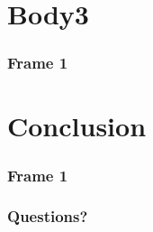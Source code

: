 \documentclass{beamer}
\begin{document}
\section{Body3}
\begin{frame}
\frametitle{Frame 1}
\end{frame}
\section{Conclusion}
\begin{frame}
\frametitle{Frame 1}
\end{frame}

\begin{frame}
\frametitle{Questions?}
\end{frame}
\end{document}
